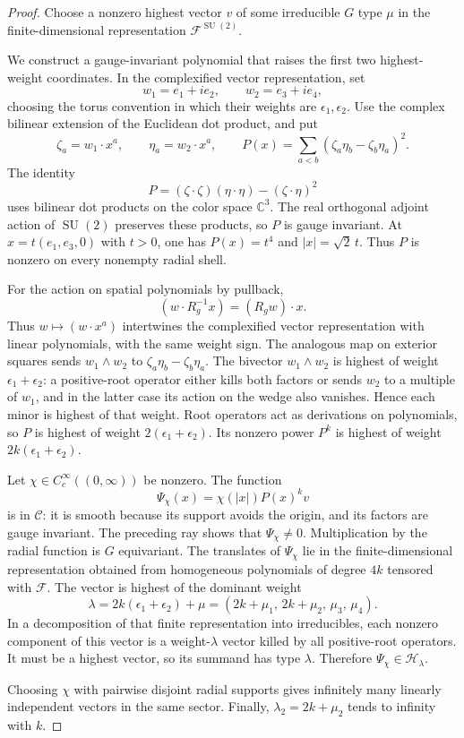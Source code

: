 \documentclass[11pt]{amsart}
\newcommand{\C}{\mathbb C}
\newcommand{\F}{\mathcal F}
\newcommand{\Core}{\mathcal C}
\newcommand{\Hphys}{\mathcal H}
\newcommand{\SU}{\operatorname{SU}}
\theoremstyle{remark}
\numberwithin{equation}{section}
\begin{document}
\begin{proof}
Choose a nonzero highest vector $v$ of some irreducible $G$ type
$\mu$ in the finite-dimensional representation $\F^{\SU(2)}$.

We construct a gauge-invariant polynomial that raises the first two
highest-weight coordinates. In the complexified vector representation, set
\[
 w_1=e_1+i e_2,\qquad w_2=e_3+i e_4,
\]
choosing the torus convention in which their weights are
$\epsilon_1,\epsilon_2$. Use the complex bilinear extension of the
Euclidean dot product, and put
\[
 \zeta_a=w_1\cdot x^a,\qquad \eta_a=w_2\cdot x^a,\qquad
 P(x)=\sum_{a<b}(\zeta_a\eta_b-\zeta_b\eta_a)^2.
\]
The identity
\[
 P=(\zeta\cdot\zeta)(\eta\cdot\eta)-(\zeta\cdot\eta)^2
\]
uses bilinear dot products on the color space $\C^3$. The real
orthogonal adjoint action of $\SU(2)$ preserves these products,
so $P$ is gauge invariant. At $x=t(e_1,e_3,0)$ with $t>0$, one has
$P(x)=t^4$ and $|x|=\sqrt2\,t$. Thus $P$ is nonzero on every
nonempty radial shell.

For the action on spatial polynomials by pullback,
\[
 (w\cdot R_g^{-1}x)=(R_gw)\cdot x.
\]
Thus $w\mapsto(w\cdot x^a)$ intertwines the complexified vector
representation with linear polynomials, with the same weight sign.
The analogous map on exterior squares sends $w_1\wedge w_2$ to
$\zeta_a\eta_b-\zeta_b\eta_a$. The bivector $w_1\wedge w_2$ is
highest of weight $\epsilon_1+\epsilon_2$: a positive-root operator
either kills both factors or sends $w_2$ to a multiple of $w_1$,
and in the latter case its action on the wedge also vanishes.
Hence each minor is highest of that weight. Root operators act as
derivations on polynomials, so $P$ is highest of weight
$2(\epsilon_1+\epsilon_2)$. Its nonzero power $P^k$ is highest of
weight $2k(\epsilon_1+\epsilon_2)$.

Let $\chi\in C_c^\infty((0,\infty))$ be nonzero. The function
\[
 \Psi_\chi(x)=\chi(|x|)P(x)^k v
\]
is in $\Core$: it is smooth because its support avoids the origin,
and its factors are gauge invariant. The preceding ray shows that
$\Psi_\chi\ne0$. Multiplication by the radial function is $G$
equivariant. The translates of $\Psi_\chi$ lie in
the finite-dimensional representation obtained from homogeneous
polynomials of degree $4k$ tensored with $\F$. The vector is
highest of the dominant weight
\[
 \lambda=2k(\epsilon_1+\epsilon_2)+\mu
       =(2k+\mu_1,\,2k+\mu_2,\,\mu_3,\,\mu_4).
\]
In a decomposition of that finite representation into irreducibles,
each nonzero component of this vector is a weight-$\lambda$ vector
killed by all positive-root operators. It must be a highest vector,
so its summand has type $\lambda$. Therefore
$\Psi_\chi\in\Hphys_\lambda$.

Choosing $\chi$ with pairwise disjoint radial supports gives infinitely
many linearly independent vectors in the same sector. Finally,
$\lambda_2=2k+\mu_2$ tends to infinity with $k$.
\end{proof}
\end{document}
